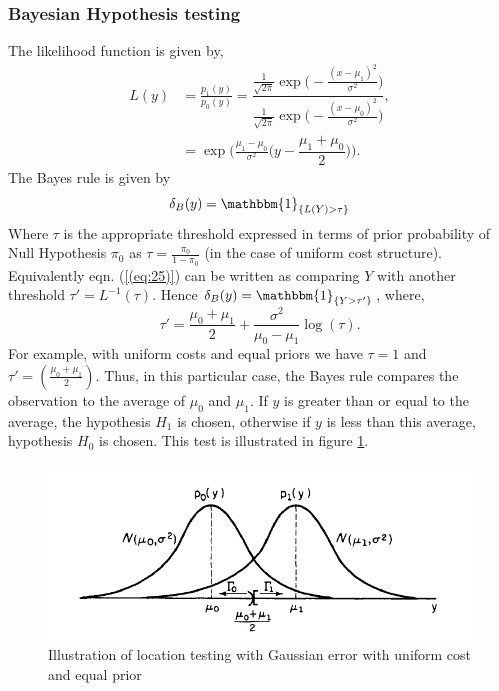 \documentclass[a4paper,english,12pt]{article}
\begin{document}
\begin{exmp}
\subsubsection*{Bayesian Hypothesis testing}
The likelihood function is given by, 
\begin{align}
L(y)&=\frac{p_{1}(y)}{p_{0}(y)} \nonumber
	=\dfrac{\frac{1}{\sqrt{2\pi}}\exp{\bigl(-\frac{(x-\mu_{1})^{2}}{\sigma^{2}}\bigr)}}{\frac{1}{\sqrt{2\pi}}\exp{\bigl(-\frac{(x-\mu_{0})^{2}}{\sigma^{2}}\bigr)}},\nonumber\\
	&=\exp\biggl(\frac{\mu_{1}-\mu_{0}}{\sigma^{2}}\bigl(y-\dfrac{\mu_{1}+\mu_{0}}{2}\bigr)\biggr).
\end{align}
The Bayes rule is given by 
\begin{equation}
\delta_{B}(y)=\mathbbm{1}_{\{ L(Y)>\tau\}}
\label{(eq:25)}
\end{equation}
Where $\tau$ is the appropriate threshold expressed in terms of prior probability of Null Hypothesis $\pi_{0}$ as $\tau=\frac{\pi_{0}}{1-\pi_{0}}$ (in the case of uniform cost structure). Equivalently eqn. (\ref{(eq:25)}) can be written as comparing $Y$ with another threshold $\tau'=L^{-1}(\tau)$. Hence $\delta_{B}(y)=\mathbbm{1}_{\{ Y>\tau'\}}$, where,
\begin{equation}
\tau'=\frac{\mu_{0}+\mu_{1}}{2}+\frac{\sigma^{2}}{\mu_{0}-\mu_{1}}\log(\tau).\label{eq:28}
\end{equation}
For example, with uniform costs and equal priors we have $\tau=1$ and $\tau'=\left(\frac{\mu_{0} + \mu_{1}}{2}\right)$. Thus, in this particular case, the Bayes rule compares the observation to the average of $\mu_{0}$ and $\mu_{1}$. If $y$ is greater than or equal to the average, the hypothesis $H_{1}$ is chosen, otherwise if $y$ is less than this average, hypothesis $H_{0}$ is chosen. This test is illustrated in figure \ref{fig:locationtesting}.
\begin{figure}[h]
\centering
\includegraphics[width=0.75\linewidth]{Figures/Location_Gaussian}
\caption{Illustration of location testing with Gaussian error with uniform cost and equal prior}
\label{fig:locationtesting}

\end{figure}
\end{exmp}
\end{document}
